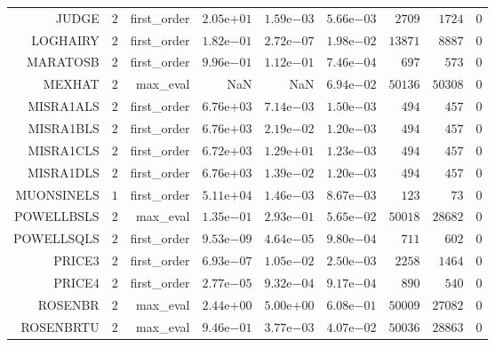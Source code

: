 \begin{longtable}{rrrrrrrrr}
JUDGE & \(     2\) & first\_order & \( 2.05\)e\(+01\) & \( 1.59\)e\(-03\) & \( 5.66\)e\(-03\) & \(  2709\) & \(  1724\) & \(     0\) \\
LOGHAIRY & \(     2\) & first\_order & \( 1.82\)e\(-01\) & \( 2.72\)e\(-07\) & \( 1.98\)e\(-02\) & \( 13871\) & \(  8887\) & \(     0\) \\
MARATOSB & \(     2\) & first\_order & \( 9.96\)e\(-01\) & \( 1.12\)e\(-01\) & \( 7.46\)e\(-04\) & \(   697\) & \(   573\) & \(     0\) \\
MEXHAT & \(     2\) & max\_eval &       NaN &       NaN & \( 6.94\)e\(-02\) & \( 50136\) & \( 50308\) & \(     0\) \\
MISRA1ALS & \(     2\) & first\_order & \( 6.76\)e\(+03\) & \( 7.14\)e\(-03\) & \( 1.50\)e\(-03\) & \(   494\) & \(   457\) & \(     0\) \\
MISRA1BLS & \(     2\) & first\_order & \( 6.76\)e\(+03\) & \( 2.19\)e\(-02\) & \( 1.20\)e\(-03\) & \(   494\) & \(   457\) & \(     0\) \\
MISRA1CLS & \(     2\) & first\_order & \( 6.72\)e\(+03\) & \( 1.29\)e\(+01\) & \( 1.23\)e\(-03\) & \(   494\) & \(   457\) & \(     0\) \\
MISRA1DLS & \(     2\) & first\_order & \( 6.76\)e\(+03\) & \( 1.39\)e\(-02\) & \( 1.20\)e\(-03\) & \(   494\) & \(   457\) & \(     0\) \\
MUONSINELS & \(     1\) & first\_order & \( 5.11\)e\(+04\) & \( 1.46\)e\(-03\) & \( 8.67\)e\(-03\) & \(   123\) & \(    73\) & \(     0\) \\
POWELLBSLS & \(     2\) & max\_eval & \( 1.35\)e\(-01\) & \( 2.93\)e\(-01\) & \( 5.65\)e\(-02\) & \( 50018\) & \( 28682\) & \(     0\) \\
POWELLSQLS & \(     2\) & first\_order & \( 9.53\)e\(-09\) & \( 4.64\)e\(-05\) & \( 9.80\)e\(-04\) & \(   711\) & \(   602\) & \(     0\) \\
PRICE3 & \(     2\) & first\_order & \( 6.93\)e\(-07\) & \( 1.05\)e\(-02\) & \( 2.50\)e\(-03\) & \(  2258\) & \(  1464\) & \(     0\) \\
PRICE4 & \(     2\) & first\_order & \( 2.77\)e\(-05\) & \( 9.32\)e\(-04\) & \( 9.17\)e\(-04\) & \(   890\) & \(   540\) & \(     0\) \\
ROSENBR & \(     2\) & max\_eval & \( 2.44\)e\(+00\) & \( 5.00\)e\(+00\) & \( 6.08\)e\(-01\) & \( 50009\) & \( 27082\) & \(     0\) \\
ROSENBRTU & \(     2\) & max\_eval & \( 9.46\)e\(-01\) & \( 3.77\)e\(-03\) & \( 4.07\)e\(-02\) & \( 50036\) & \( 28863\) & \(     0\) \\

\end{longtable}
